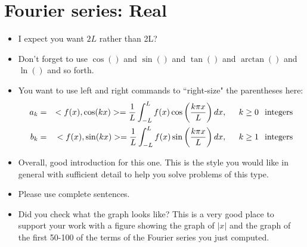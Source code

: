 \documentclass{article}
\newcommand{\bea}{\begin{eqnarray*}}
\newcommand{\eea}{\end{eqnarray*}}
\begin{document}
\section{Fourier series: Real}
\begin{itemize}
\item I expect you want $2L$ rather than 2L?
\item Don't forget to use $\cos()$ and $\sin()$ and $\tan()$ and $\arctan()$ and $\ln()$ and so forth.
\item You want to use left and right commands to ``right-size" the parentheses here:
\bea
a_k &=& <f(x),\cos(kx)> = \dfrac{1}{L}\int_{-L}^{L} f(x)\cos\left(\dfrac{k \pi x}{L}\right)dx, \hspace{.2in}  k\geq0 \hspace{.1in} \mbox{integers} \\
b_k &=& <f(x),\sin(kx)> = \dfrac{1}{L}\int_{-L}^{L} f(x)\sin\left(\dfrac{k \pi x}{L}\right)dx, \hspace{.2in} k\geq1 \hspace{.1in} \mbox{integers} \\
\eea
\item Overall, good introduction for this one. This is the style you would like in general with sufficient detail to help you solve problems of this type.
\item Please use complete sentences. 
\item Did you check what the graph looks like? This is a very good place to support your work with a figure showing the graph of $|x|$ and the graph of the first 50-100 of the terms of the Fourier series you just computed. 
\end{itemize}
\end{document}
